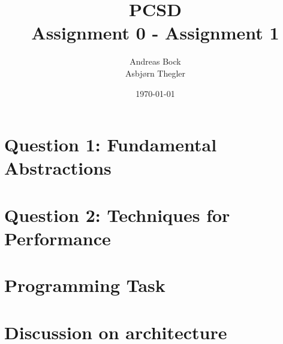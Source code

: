 \documentclass[11pt]{article}
\def\Title{\textbf{PCSD}\\
\vspace{0.5cm}
Assignment 0 - Assignment 1}
\def\Author{Andreas Bock\\
Asbjørn Thegler}
\begin{document}
\title{\Title}
\author{\Author}
\date{\today}
\maketitle

\section*{Question 1: Fundamental Abstractions}





\section*{Question 2: Techniques for Performance}

\section*{Programming Task}

\section*{Discussion on architecture}
\end{document}
